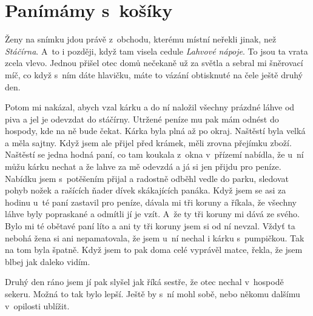 
\chapter{Panímámy s~košíky}

Ženy na snímku jdou právě z~obchodu, kterému místní neřekli jinak, než {\em
Stáčírna}. A~to i později, když tam visela cedule {\em Lahvové nápoje}. To jsou
ta vrata zcela vlevo. Jednou přišel otec domů nečekaně už za světla a sebral mi
šněrovací míč, co když s~ním dáte hlavičku, máte to vázání obtisknuté na čele
ještě druhý den.

Potom mi nakázal, abych vzal kárku a do ní naložil všechny prázdné láhve od
piva a jel je odevzdat do stáčírny. Utržené peníze mu pak mám odnést do
hospody, kde na ně bude čekat. Kárka byla plná až po okraj. Naštěstí byla velká
a měla sajtny. Když jsem ale přijel před krámek, měli zrovna přejímku zboží.
Naštěstí se jedna hodná paní, co tam koukala z~okna v~přízemí nabídla, že u~ní
můžu kárku nechat a že lahve za mě odevzdá a já si jen přijdu pro peníze.
Nabídku jsem s~potěšením přijal a radostně odběhl vedle do parku, sledovat
pohyb nožek a rašících ňader dívek skákajících panáka. Když jsem se asi za
hodinu u~té paní zastavil pro peníze, dávala mi tři koruny a říkala, že všechny
láhve byly popraskané a odmítli jí je vzít. A~že ty tři koruny mi dává ze
svého. Bylo mi té obětavé paní líto a ani ty tři koruny jsem si od ní nevzal.
Vždyť ta nebohá žena si ani nepamatovala, že jsem u~ní nechal i kárku
s~pumpičkou. Tak na tom byla špatně. Když jsem to pak doma celé vyprávěl matce,
řekla, že jsem blbej jak daleko vidím.

Druhý den ráno jsem jí pak slyšel jak říká sestře, že otec nechal
v~hospodě sekeru. Možná to tak bylo lepší. Ještě by s~ní mohl sobě, nebo
někomu dalšímu v~opilosti ublížit.
